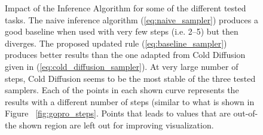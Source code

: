 \begin{figure}[t]
    
    \caption{Impact of the Inference Algorithm for some of the different tested tasks. The naive inference algorithm (\eqref{eq:naive_sampler}) produces a good baseline when used with very few steps (i.e. 2--5) but then diverges. The proposed updated rule (\eqref{eq:baseline_sampler}) produces better results than the one adapted from Cold Diffusion~\citep{bansal2022cold} given in (\eqref{eq:cold_diffusion_sampler}). At very large number of steps, Cold Diffusion seems to be the most stable of the three tested samplers.  Each of the points in each shown curve represents the results with a different number of steps (similar to what is shown in Figure
   ~\ref{fig:gopro_steps}. Points that leads to values that are out-of-the shown region are left out for improving visualization. }
    \label{fig:impact_sampler}
\end{figure}